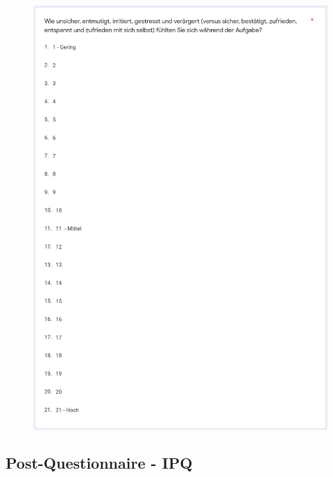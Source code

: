 \documentclass[a4paper,11pt]{article}%
\renewcommand{\\}{\vspace*{0.5\baselineskip} \newline}
\begin{document}
	\begin{figure}[H]
	\centering
		\begin{footnotesize}
			\includegraphics[scale=0.6]{Abbildungen/Fragebogen/Post-Questionnaire/PQTLX6}
		\end{footnotesize}
	\end{figure}	

\newpage
\subsection{Post-Questionnaire - IPQ}
\label{Post-Questionnaire - IPQ}
\end{document}
